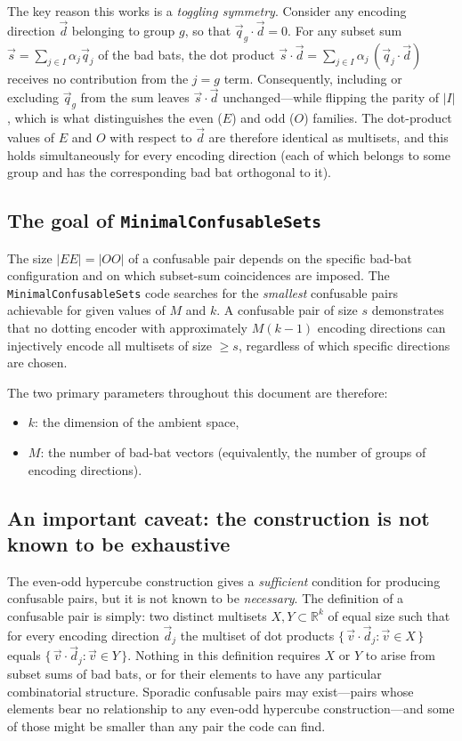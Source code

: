 \documentclass[12pt,a4paper]{article}
\begin{document}
The key reason this works is a \emph{toggling symmetry}. Consider any
encoding direction $\vec{d}$ belonging to group $g$, so that
$\vec{q}_g \cdot \vec{d} = 0$. For any subset sum
$\vec{s} = \sum_{j \in I} \alpha_j \vec{q}_j$ of the bad bats, the dot
product $\vec{s} \cdot \vec{d} = \sum_{j \in I} \alpha_j\,(\vec{q}_j \cdot
\vec{d})$ receives no contribution from the $j = g$ term.  Consequently,
including or excluding $\vec{q}_g$ from the sum leaves $\vec{s} \cdot \vec{d}$
unchanged---while flipping the parity of $|I|$, which is what distinguishes
the even ($E$) and odd ($O$) families.  The dot-product values of $E$ and $O$
with respect to $\vec{d}$ are therefore identical as multisets, and this holds
simultaneously for every encoding direction (each of which belongs to some
group and has the corresponding bad bat orthogonal to it).

\subsection*{The goal of \texttt{MinimalConfusableSets}}

The size $|EE| = |OO|$ of a confusable pair depends on the specific bad-bat
configuration and on which subset-sum coincidences are imposed.  The
\texttt{MinimalConfusableSets} code searches for the \emph{smallest} confusable
pairs achievable for given values of $M$ and $k$.  A confusable pair of size
$s$ demonstrates that no dotting encoder with approximately $M(k-1)$ encoding
directions can injectively encode all multisets of size $\geq s$, regardless
of which specific directions are chosen.

The two primary parameters throughout this document are therefore:
\begin{itemize}
  \item $k$: the dimension of the ambient space,
  \item $M$: the number of bad-bat vectors (equivalently, the number of
    groups of encoding directions).
\end{itemize}

\subsection*{An important caveat: the construction is not known to be exhaustive}

The even-odd hypercube construction gives a \emph{sufficient} condition for
producing confusable pairs, but it is not known to be \emph{necessary}.  The
definition of a confusable pair is simply: two distinct multisets
$X, Y \subset \mathbb{R}^k$ of equal size such that for every encoding
direction $\vec{d}_j$ the multiset of dot products
$\{\,\vec{v}\cdot\vec{d}_j : \vec{v}\in X\,\}$ equals
$\{\,\vec{v}\cdot\vec{d}_j : \vec{v}\in Y\,\}$.
Nothing in this definition requires $X$ or $Y$ to arise from subset sums of
bad bats, or for their elements to have any particular combinatorial structure.
Sporadic confusable pairs may exist---pairs whose elements bear no relationship
to any even-odd hypercube construction---and some of those might be smaller
than any pair the code can find.
\end{document}
